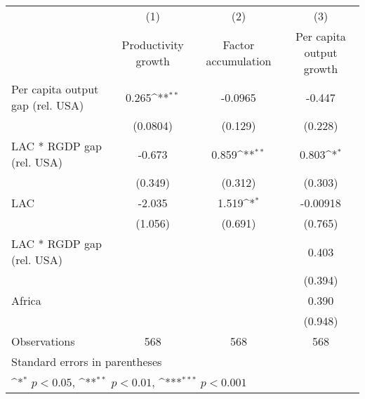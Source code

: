 {
\def\sym#1{\ifmmode^{#1}\else\(^{#1}\)\fi}
\begin{tabular}{l*{3}{c}}
\hline\hline
                    &\multicolumn{1}{c}{(1)}&\multicolumn{1}{c}{(2)}&\multicolumn{1}{c}{(3)}\\
                    &\multicolumn{1}{c}{Productivity growth}&\multicolumn{1}{c}{Factor accumulation}&\multicolumn{1}{c}{Per capita output growth}\\
\hline
Per capita output gap (rel. USA)&       0.265\sym{**} &     -0.0965         &      -0.447         \\
                    &    (0.0804)         &     (0.129)         &     (0.228)         \\
[1em]
LAC * RGDP gap (rel. USA)&      -0.673         &       0.859\sym{**} &       0.803\sym{*}  \\
                    &     (0.349)         &     (0.312)         &     (0.303)         \\
[1em]
LAC                 &      -2.035         &       1.519\sym{*}  &    -0.00918         \\
                    &     (1.056)         &     (0.691)         &     (0.765)         \\
[1em]
LAC * RGDP gap (rel. USA)&                     &                     &       0.403         \\
                    &                     &                     &     (0.394)         \\
[1em]
Africa              &                     &                     &       0.390         \\
                    &                     &                     &     (0.948)         \\
\hline
Observations        &         568         &         568         &         568         \\
\hline\hline
\multicolumn{4}{l}{\footnotesize Standard errors in parentheses}\\
\multicolumn{4}{l}{\footnotesize \sym{*} \(p<0.05\), \sym{**} \(p<0.01\), \sym{***} \(p<0.001\)}\\
\end{tabular}
}
